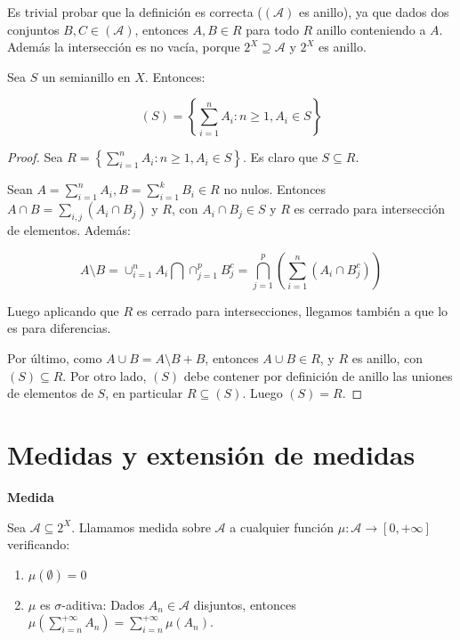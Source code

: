 Es trivial probar que la definición es correcta ($(\mathcal{A})$ es anillo), ya que dados dos 
conjuntos $B,C \in (\mathcal{A})$, entonces $A, B \in R$ para todo $R$ anillo conteniendo a $A$. Además la
intersección es no vacía, porque $2^X \supseteq \mathcal{A}$ y $2^X$ es anillo.

\begin{fact}
 Sea $S$ un semianillo en $X$. Entonces:
 
 \[(S) = \left\{\sum_{i=1}^n A_i:  n\ge 1, A_i \in S\right\}\]
 
 \label{claim:semiring}
\end{fact}

\begin{proof}
 Sea $R= \left\{\sum_{i=1}^n A_i:  n\ge 1, A_i \in S\right\}$. Es claro que $S\subseteq R$.
 
 Sean $A = \sum_{i=1}^n A_i, B = \sum_{i=1}^k B_i \in R$ no nulos. Entonces $A\cap B = \sum_{i,j} (A_i \cap B_j)$ 
 y $R$, con $A_i\cap B_j \in S$ y $R$ es cerrado para intersección de elementos. Además:
 
 \[A\setminus B = \cup_{i=1}^n A_i \bigcap \cap_{j=1}^p B_j^c = \bigcap_{j=1}^p 
                  \left(\sum_{i=1}^n (A_i \cap B_j^c)\right)\]
 
 Luego aplicando que $R$ es cerrado para intersecciones, llegamos también a que lo es para diferencias.
 
 Por último, como $A\cup B = A \setminus B + B$, entonces $A \cup B \in R$, y $R$ es anillo, con $(S) \subseteq R$.
 Por otro lado, $(S)$ debe contener por definición de anillo las uniones de elementos de $S$, en particular
 $R\subseteq (S)$. Luego $(S) = R$.
\end{proof}


\section{Medidas y extensión de medidas}

\begin{definition} \textbf{Medida}

 Sea $\mathcal{A} \subseteq 2^X$. Llamamos medida sobre $\mathcal{A}$ a cualquier función 
 $\mu: \mathcal{A} \rightarrow [0, +\infty]$ verificando:

 \begin{enumerate}[i]
  \item $\mu(\emptyset) = 0$
  \item $\mu$ es $\sigma$-aditiva: Dados $A_n \in \mathcal{A}$ disjuntos, entonces 
   $\mu\left(\sum_{i=n}^{+\infty} A_n \right)= \sum_{i=n}^{+\infty} \mu(A_n)$.
 \end{enumerate}
\end{definition}

